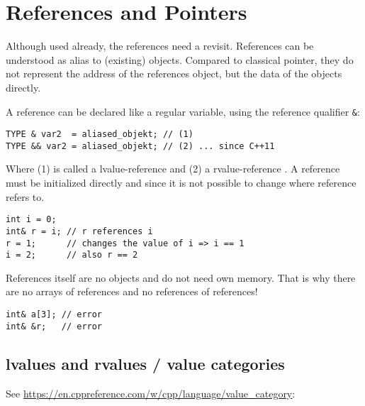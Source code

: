 
\section{References and Pointers\label{sec:references}}
Although used already, the references need a revisit. References can be understood as alias to (existing) objects. Compared to classical
pointer, they do not represent the address of the references object, but the data of the objects directly.

A reference can be declared like a regular variable, using the reference qualifier \texttt{\&}:
\begin{verbatim}
TYPE & var2  = aliased_objekt; // (1)
TYPE && var2 = aliased_objekt; // (2) ... since C++11
\end{verbatim}
Where (1) is called a lvalue-reference  and (2) a rvalue-reference . A reference
must be initialized directly and since it is not possible to change where reference refers to.

\begin{verbatim}
int i = 0;
int& r = i; // r references i
r = 1;      // changes the value of i => i == 1
i = 2;      // also r == 2
\end{verbatim}

References itself are no objects and do not need own memory. That is why there are no arrays of references and no references of references!
\begin{verbatim}
int& a[3]; // error
int& &r;   // error
\end{verbatim}


\subsection{lvalues and rvalues / value categories}
See \url{https://en.cppreference.com/w/cpp/language/value_category}:

